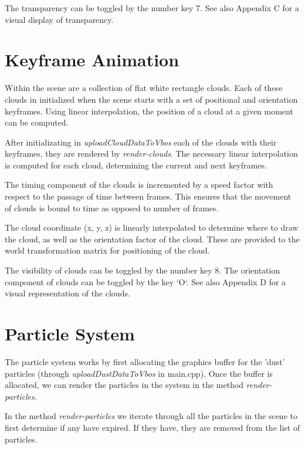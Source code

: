 \documentclass{book}
\begin{document}
The transparency can be toggled by the number key 7.  See also Appendix C for a visual display of transparency.
    
\section{Keyframe Animation}
    
Within the scene are a collection of flat white rectangle clouds.  Each of these clouds in initialized when the scene starts with a set of positional and orientation keyframes.  Using linear interpolation, the position of a cloud at a given moment can be computed.
    
After initializating in \textit{uploadCloudDataToVbos} each of the clouds with their keyframes, they are rendered by \textit{render-clouds}.  The necessary linear interpolation is computed for each cloud, determining the current and next keyframes.
    
The timing component of the clouds is incremented by a speed factor with respect to the passage of time between frames.  This ensures that the movement of clouds is bound to time as opposed to number of frames.  
    
The cloud coordinate (x, y, z) is linearly interpolated to determine where to draw the cloud, as well as the orientation factor of the cloud.  These are provided to the world transformation matrix for positioning of the cloud.
    
The visibility of clouds can be toggled by the number key 8.  The orientation component of clouds can be toggled by the key `O`.  See also Appendix D for a visual representation of the clouds.
    
\section{Particle System}
    
The particle system works by first allocating the graphics buffer for the 'dust' particles (through \textit{uploadDustDataToVbos} in main.cpp).  Once the buffer is allocated, we can render the particles in the system in the method \textit{render-particles}.
    
In the method \textit{render-particles} we iterate through all the particles in the scene to first determine if any have expired.  If they have, they are removed from the list of particles.
    
\end{document}
